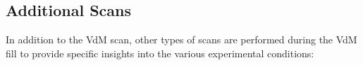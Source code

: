 

\subsection{Additional Scans}

In addition to the VdM scan, other types of scans are performed during the VdM fill to provide specific insights into the various experimental conditions:


